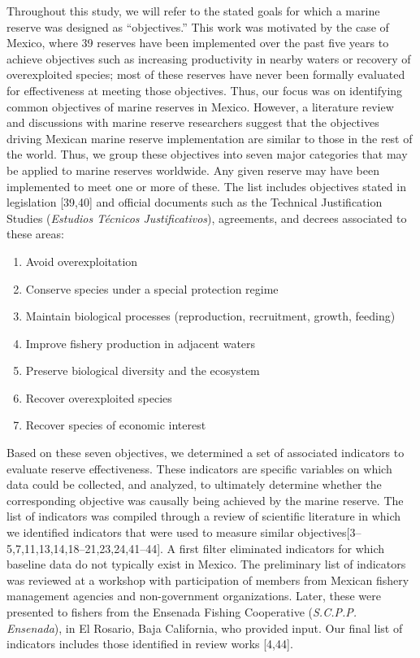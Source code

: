 \documentclass[12pt,]{article}
\providecommand{\tightlist}{%
  \setlength{\itemsep}{0pt}\setlength{\parskip}{0pt}}
\begin{document}
Throughout this study, we will refer to the stated goals for which a
marine reserve was designed as ``objectives.'' This work was motivated
by the case of Mexico, where 39 reserves have been implemented over the
past five years to achieve objectives such as increasing productivity in
nearby waters or recovery of overexploited species; most of these
reserves have never been formally evaluated for effectiveness at meeting
those objectives. Thus, our focus was on identifying common objectives
of marine reserves in Mexico. However, a literature review and
discussions with marine reserve researchers suggest that the objectives
driving Mexican marine reserve implementation are similar to those in
the rest of the world. Thus, we group these objectives into seven major
categories that may be applied to marine reserves worldwide. Any given
reserve may have been implemented to meet one or more of these. The list
includes objectives stated in legislation {[}39,40{]} and official
documents such as the Technical Justification Studies (\emph{Estudios
Técnicos Justificativos}), agreements, and decrees associated to these
areas:

\begin{enumerate}
\def\labelenumi{\arabic{enumi}.}
\tightlist
\item
  Avoid overexploitation
\item
  Conserve species under a special protection regime
\item
  Maintain biological processes (reproduction, recruitment, growth,
  feeding)
\item
  Improve fishery production in adjacent waters
\item
  Preserve biological diversity and the ecosystem
\item
  Recover overexploited species
\item
  Recover species of economic interest
\end{enumerate}

Based on these seven objectives, we determined a set of associated
indicators to evaluate reserve effectiveness. These indicators are
specific variables on which data could be collected, and analyzed, to
ultimately determine whether the corresponding objective was causally
being achieved by the marine reserve. The list of indicators was
compiled through a review of scientific literature in which we
identified indicators that were used to measure similar
objectives{[}3--5,7,11,13,14,18--21,23,24,41--44{]}. A first filter
eliminated indicators for which baseline data do not typically exist in
Mexico. The preliminary list of indicators was reviewed at a workshop
with participation of members from Mexican fishery management agencies
and non-government organizations. Later, these were presented to fishers
from the Ensenada Fishing Cooperative (\emph{S.C.P.P. Ensenada}), in El
Rosario, Baja California, who provided input. Our final list of
indicators includes those identified in review works {[}4,44{]}.
\end{document}
